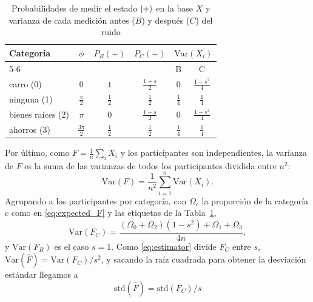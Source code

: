 \documentclass{ieeeaccess}
\begin{document}
\begin{table}[H]
  \caption{Probabilidades de medir el estado $\ket{+}$ en la base $X$ y varianza de cada medición antes ($B$) y después ($C$) del ruido}
  \label{tab:collateral_probabilities}
  \centering
  \renewcommand{\arraystretch}{1.3}
  \begin{tabular}{lccccc}
    \toprule
    Categoría & $\phi$ & $P_B(+)$ & $P_C(+)$ & \multicolumn{2}{c}{$\mathrm{Var}(X_i)$} \\
    \cmidrule(l){5-6}
     & & & & B & C \\
    \midrule
    carro (0)         & $0$                & $1$            & $\tfrac{1+s}{2}$ & $0$            & $\tfrac{1-s^2}{4}$ \\
    ninguna (1)       & $\tfrac{\pi}{2}$   & $\tfrac{1}{2}$ & $\tfrac{1}{2}$   & $\tfrac{1}{4}$ & $\tfrac{1}{4}$ \\
    bienes raíces (2) & $\pi$              & $0$            & $\tfrac{1-s}{2}$ & $0$            & $\tfrac{1-s^2}{4}$ \\
    ahorros (3)       & $\tfrac{3\pi}{2}$  & $\tfrac{1}{2}$ & $\tfrac{1}{2}$   & $\tfrac{1}{4}$ & $\tfrac{1}{4}$ \\
    \bottomrule
  \end{tabular}
\end{table}

Por último, como $F = \frac{1}{n}\sum_{i} X_i$ y los participantes son independientes, la varianza de $F$ es la suma de las varianzas de todos los participantes dividida entre $n^2$:
\begin{equation}
  \mathrm{Var}(F) = \frac{1}{n^2}\sum_{i=1}^{n}\mathrm{Var}(X_i).
  \label{eq:var_F}
\end{equation}
Agrupando a los participantes por categoría, con $\Omega_c$ la proporción de la categoría $c$ como en \eqref{eq:expected_F} y las etiquetas de la Tabla~\ref{tab:collateral_probabilities},
\begin{equation}
  \mathrm{Var}(F_C) = \frac{(\Omega_0 + \Omega_2)(1 - s^2) + \Omega_1 + \Omega_3}{4n},
  \label{eq:var_fc}
\end{equation}
y $\mathrm{Var}(F_B)$ es el caso $s = 1$. Como \eqref{eq:estimator} divide $F_C$ entre $s$, $\mathrm{Var}(\hat{F}) = \mathrm{Var}(F_C)/s^2$, y sacando la raíz cuadrada para obtener la desviación estándar llegamos a
\begin{equation}
  \mathrm{std}(\hat{F}) = \mathrm{std}(F_C)/s
  \label{eq:corrected_std}
\end{equation}
\end{document}
